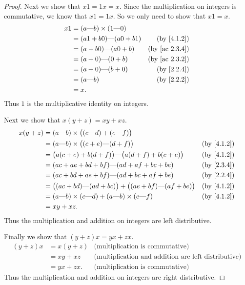 \begin{proof}
  Next we show that \(x1 = 1x = x\).
  Since the multiplication on integers is commutative, we know that \(x1 = 1x\).
  So we only need to show that \(x1 = x\).
  \begin{align*}
    x1 & = (a \text{---} b) \times (1 \text{---} 0)                               \\
       & = (a1 + b0) \text{---} (a0 + b1)           & \text{(by \cref{4.1.2})}    \\
       & = (a + b0) \text{---} (a0 + b)             & \text{(by \cref{ac 2.3.4})} \\
       & = (a + 0) \text{---} (0 + b)               & \text{(by \cref{ac 2.3.2})} \\
       & = (a + 0) \text{---} (b + 0)               & \text{(by \cref{2.2.4})}    \\
       & = (a \text{---} b)                         & \text{(by \cref{2.2.2})}    \\
       & = x.
  \end{align*}
  Thus \(1\) is the multiplicative identity on integers.

  Next we show that \(x(y + z) = xy + xz\).
  \begin{align*}
    x(y + z) & = (a \text{---} b) \times \big((c \text{---} d) + (e \text{---} f)\big)                                          \\
             & = (a \text{---} b) \times \big((c + e) \text{---} (d + f)\big)                        & \text{(by \cref{4.1.2})} \\
             & = \big(a(c + e) + b(d + f)\big) \text{---} \big(a(d + f) + b(c + e)\big)              & \text{(by \cref{4.1.2})} \\
             & = (ac + ae + bd + bf) \text{---} (ad + af + bc + be)                                  & \text{(by \cref{2.3.4})} \\
             & = (ac + bd + ae + bf) \text{---} (ad + bc + af + be)                                  & \text{(by \cref{2.2.4})} \\
             & = \big((ac + bd) \text{---} (ad + bc)\big) + \big((ae + bf) \text{---} (af + be)\big) & \text{(by \cref{4.1.2})} \\
             & = (a \text{---} b) \times (c \text{---} d) + (a \text{---} b) \times (e \text{---} f) & \text{(by \cref{4.1.2})} \\
             & = xy + xz.
  \end{align*}
  Thus the multiplication and addition on integers are left distributive.

  Finally we show that \((y + z)x = yx + zx\).
  \begin{align*}
    (y + z)x & = x(y + z) & \text{(multiplication is commutative)}                     \\
             & = xy + xz  & \text{(multiplication and addition are left distributive)} \\
             & = yx + zx. & \text{(multiplication is commutative)}
  \end{align*}
  Thus the multiplication and addition on integers are right distributive.
\end{proof}

